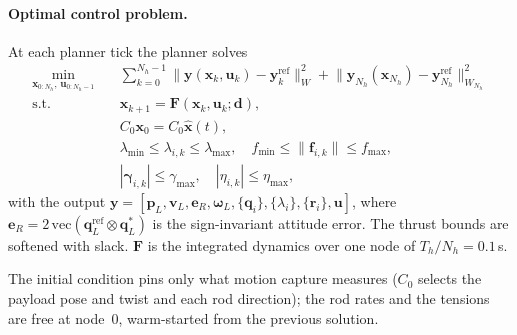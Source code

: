 \paragraph{Optimal control problem.} At each planner tick the planner solves
\begin{equation}
\begin{aligned}
    \min_{\mathbf{x}_{0:N_h},\, \mathbf{u}_{0:N_h-1}} \quad & \sum_{k=0}^{N_h-1} \big\| \mathbf{y}(\mathbf{x}_k, \mathbf{u}_k) - \mathbf{y}_k^{\mathrm{ref}} \big\|_{W}^{2}
    + \big\| \mathbf{y}_{N_h}(\mathbf{x}_{N_h}) - \mathbf{y}_{N_h}^{\mathrm{ref}} \big\|_{W_{N_h}}^{2} \\
    \text{s.t.} \quad & \mathbf{x}_{k+1} = \mathbf{F}(\mathbf{x}_k, \mathbf{u}_k; \mathbf{d}), \\
    & C_0 \mathbf{x}_0 = C_0 \hat{\mathbf{x}}(t), \\
    & \lambda_{\min} \le \lambda_{i,k} \le \lambda_{\max}, \quad f_{\min} \le \|\mathbf{f}_{i,k}\| \le f_{\max}, \\
    & |\boldsymbol{\gamma}_{i,k}| \le \gamma_{\max}, \quad |\eta_{i,k}| \le \eta_{\max},
\end{aligned}
\label{eq:plan_ocp}
\end{equation}
with the output
$\mathbf{y} = [\mathbf{p}_L, \mathbf{v}_L, \mathbf{e}_R, \boldsymbol{\omega}_L, \{\mathbf{q}_i\}, \{\lambda_i\}, \{\mathbf{r}_i\}, \mathbf{u}]$,
where $\mathbf{e}_R = 2\,\mathrm{vec}(\mathbf{q}_L^{\mathrm{ref}} \otimes \mathbf{q}_L^{*})$ is the sign-invariant
attitude error. The thrust bounds are softened with slack. $\mathbf{F}$ is the integrated dynamics
over one node of $T_h/N_h = 0.1$\,s.

The initial condition pins only what motion capture measures ($C_0$ selects the payload pose and twist and each rod
direction); the rod rates and the tensions are free at node~0, warm-started from the previous solution.

